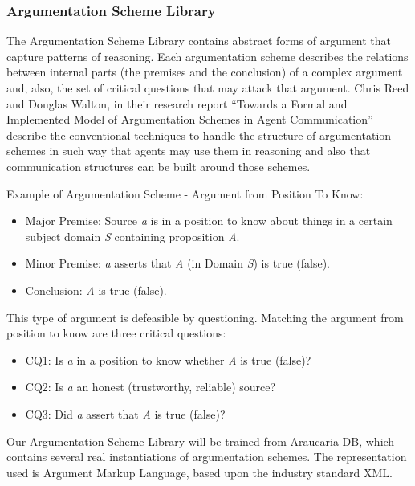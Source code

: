 \subsubsection {Argumentation Scheme Library}
\par
The Argumentation Scheme Library contains abstract forms of argument that capture patterns of reasoning. Each argumentation scheme describes the relations between internal parts (the premises and the conclusion) of a complex argument and, also, the set of critical questions that may attack that argument. Chris Reed and Douglas Walton\cite{reedwalton}, in their research report ``Towards a Formal and Implemented Model of Argumentation Schemes in Agent Communication'' describe the conventional techniques to handle the structure of argumentation schemes in such way that agents may use them in reasoning and also that communication structures can be built around those schemes.
\par
Example of Argumentation Scheme - Argument from Position To Know:
\begin{itemize}
\item Major Premise: Source \emph{a} is in a position to know about things in a certain subject domain \emph{S} containing proposition \emph{A}.
\item Minor Premise: \emph{a} asserts that \emph{A} (in Domain \emph{S}) is true (false).
\item Conclusion: \emph{A} is true (false).
\end{itemize}

This type of argument is defeasible by questioning. Matching the argument from position to know are three critical questions:
\begin{itemize}
\item CQ1: Is \emph{a} in a position to know whether \emph{A} is true (false)?
\item CQ2: Is \emph{a} an honest (trustworthy, reliable) source?
\item CQ3: Did \emph{a} assert that \emph{A} is true (false)?
\end{itemize}
\par
Our Argumentation Scheme Library will be trained from Araucaria DB, which contains several real instantiations of argumentation schemes. The representation used is Argument Markup Language, based upon the industry standard XML.

